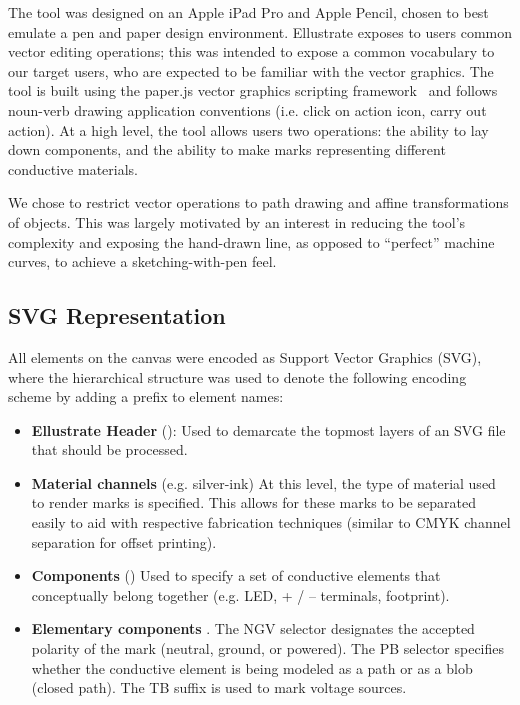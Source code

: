 \documentclass{sigchi}
\begin{document}
    The tool was designed on an Apple iPad Pro and Apple Pencil, chosen to best emulate a pen and paper design environment.  Ellustrate exposes to users common vector editing operations; this was intended to expose a common vocabulary to our target users, who are expected to be familiar with the vector graphics. The tool is built using the paper.js vector graphics scripting framework~\cite{lehni_paperjs_2011} and follows noun-verb drawing application conventions (i.e. click on action icon, carry out action). At a high level, the tool allows users two operations: the ability to lay down components, and the ability to make marks representing different conductive materials.

    We chose to restrict vector operations to path drawing and affine transformations of objects. This was largely motivated by an interest in reducing the tool's complexity and exposing the hand-drawn line, as opposed to ``perfect'' machine curves, to achieve a sketching-with-pen feel.

    \subsection{SVG Representation}
    All elements on the canvas were encoded as Support Vector Graphics (SVG), where the hierarchical structure was used to denote the following encoding scheme by adding a prefix to element names:
    \begin{itemize}
        \item \textbf{Ellustrate Header} (): Used to demarcate the topmost layers of an SVG file that should be processed.
        \item \textbf{Material channels} (e.g.  silver-ink) At this level, the type of material used to render marks is specified. This allows for these marks to be separated easily to aid with respective fabrication techniques (similar to CMYK channel separation for offset printing).
        \item \textbf{Components} () Used to specify a set of conductive elements that conceptually belong together (e.g. LED, + / – terminals, footprint).
        \item \textbf{Elementary components} .
        The N\textbar G\textbar V selector designates the accepted polarity of the mark (neutral, ground, or powered). The P\textbar B selector specifies whether the conductive element is being modeled as a path or as a blob (closed path). The TB suffix is used to mark voltage sources.
    \end{itemize}
\end{document}
